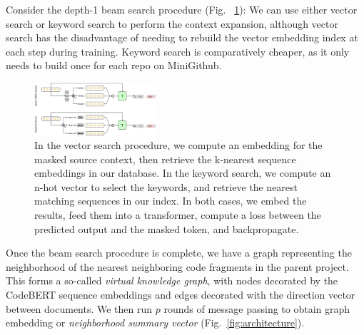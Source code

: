 \documentclass[sigconf]{acmart}
\begin{document}
  Consider the depth-1 beam search procedure (Fig. ~\ref{fig:pipeline}): We can use either vector search or keyword search to perform the context expansion, although vector search has the disadvantage of needing to rebuild the vector embedding index at each step during training. Keyword search is comparatively cheaper, as it only needs to build once for each repo on MiniGithub.

  \begin{figure}[H]
    \centering
    \includegraphics[width=0.4\textwidth]{figs/knn_vs_vec}
    \caption{In the vector search procedure, we compute an embedding for the masked source context, then retrieve the k-nearest sequence embeddings in our database. In the keyword search, we compute an n-hot vector to select the keywords, and retrieve the nearest matching sequences in our index. In both cases, we embed the results, feed them into a transformer, compute a loss between the predicted output and the masked token, and backpropagate.}
    \label{fig:pipeline}
  \end{figure}

  Once the beam search procedure is complete, we have a graph representing the neighborhood of the nearest neighboring code fragments in the parent project. This forms a so-called \textit{virtual knowledge graph}, with nodes decorated by the CodeBERT sequence embeddings and edges decorated with the direction vector between documents. We then run $p$ rounds of message passing to obtain graph embedding or \textit{neighborhood summary vector} (Fig.~\ref{fig:architecture}).

%
\end{document}

